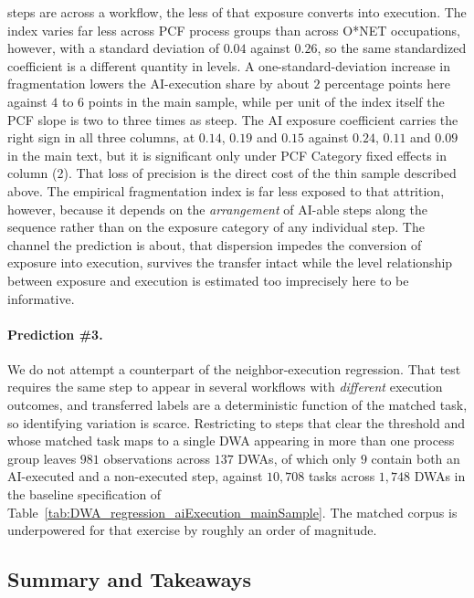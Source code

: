 steps are across a workflow, the less of that exposure converts into execution.
The index varies far less across PCF process groups than across O*NET occupations, however, with a standard
deviation of $0.04$ against $0.26$, so the same standardized coefficient is a different quantity in levels.
A one-standard-deviation increase in fragmentation lowers the AI-execution share by about $2$ percentage
points here against $4$ to $6$ points in the main sample, while per unit of the index itself the PCF slope is
two to three times as steep.
The AI exposure coefficient carries the right sign in all three columns, at $0.14$, $0.19$ and $0.15$ against
$0.24$, $0.11$ and $0.09$ in the main text, but it is significant only under PCF Category fixed effects in column (2).
That loss of precision is the direct cost of the thin sample described above.
The empirical fragmentation index is far less exposed to that attrition, however, because it depends on the \emph{arrangement} of AI-able steps along the sequence rather than on the exposure category of any individual step.
The channel the prediction is about, that dispersion impedes the conversion of exposure into execution,
survives the transfer intact while the level relationship between exposure and execution is estimated too imprecisely here to be informative.

\paragraph{Prediction \#3.}
We do not attempt a counterpart of the neighbor-execution regression.
That test requires the same step to appear in several workflows with \emph{different} execution outcomes, and
transferred labels are a deterministic function of the matched task, so identifying variation is scarce.
Restricting to steps that clear the threshold and whose matched task maps to a single DWA appearing in more
than one process group leaves $981$ observations across $137$ DWAs, of which only $9$ contain both an
AI-executed and a non-executed step, against $10{,}708$ tasks across $1{,}748$ DWAs in the baseline specification of
Table~\ref{tab:DWA_regression_aiExecution_mainSample}.
The matched corpus is underpowered for that exercise by roughly an order of magnitude.

\subsection{Summary and Takeaways}
\label{app:external_validation_discussion}

